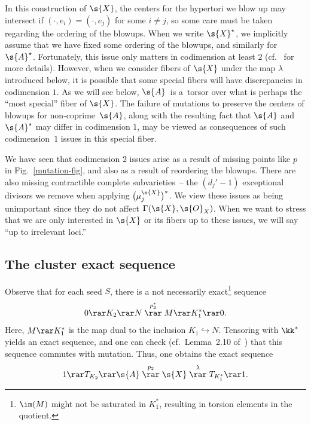 \begin{rmk}\label{CodimensionOne}In this construction of $\s{X}$, the centers for the hypertori we blow up may intersect if $(\cdot,e_i)=(\cdot,e_j)$ for some $i\neq j$, so some care must be taken regarding the ordering of the blowups. When we write $\s{X}^{\star}$, we implicitly assume that we have fixed some ordering of the blowups, and similarly for $\s{A}^{\star}$. Fortunately, this issue only matters in codimension at least $2$ (cf.~\cite{GHK3} for more details). However, when we consider fibers of $\s{X}$ under the map $\lambda$ introduced below, it is possible that some special fibers will have discrepancies in codimension $1$. As we will see below, $\s{A}$~is a~torsor over what is perhaps the ``most special'' fiber of $\s{X}$. The failure of mutations to preserve the centers of blowups for non-coprime~$\s{A}$, along with the resulting fact that $\s{A}$ and $\s{A}^{\star}$ may differ in codimension $1$, may be viewed as consequences of such codimension~$1$ issues in this special fiber.
\end{rmk}

\begin{rmk}\label{affinization}We have seen that codimension $2$ issues arise as a result of missing points like $p$ in Fig.~\ref{mutation-fig}, and also as a result of reordering the blowups. There are also missing contractible complete subvarieties~-- the $(d_j'-1)$ exceptional divisors we remove when applying $\big(\mu_j^{\s{X}}\big)^*$. We view these issues as being unimportant since they do not affect $\Gamma(\s{X},\s{O}_X)$. When we want to stress that we are only interested in $\s{X}$ or its fibers up to these issues, we will say ``up to irrelevant loci.''
\end{rmk}

\subsection{The cluster exact sequence}\label{cluster exact section}
Observe that for each seed $S$, there is a not necessarily exact\footnote{$\im(M)$ might not be saturated in $K_1^*$, resulting in torsion elements in the quotient.} sequence
\begin{gather*}
	0 \rar K_2 \rar N \stackrel{p_2^*}{\rar} M \rar K_1^* \rar 0.
\end{gather*}
Here, $M\rar K_1^*$ is the map dual to the inclusion $K_1\hookrightarrow N$. Tensoring with $\kk^*$ yields an exact sequence, and one can check (cf.\ Lemma~2.10 of~\cite{FG1}) that this sequence commutes with mutation. Thus, one obtains the exact sequence
\begin{gather*}
	1\rar T_{K_2} \rar \s{A} \stackrel{p_2}{\rar} \s{X} \stackrel{\lambda}{\rar} T_{K_1^*} \rar 1.
\end{gather*}

